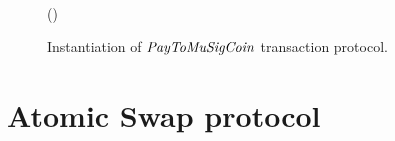 \begin{figure}
\begin{center}
{\begin{varwidth}{\textwidth}
{            \varSigAlice \opFunResult {} \< \< \\
            \varSigFin \opFunResult \procFinSig{\varSigAlice}{\varSigBob} \< \< \\
            \varExcess \opAssign {} \opAddPoint {} \< \< \\
            \scriptstyle \pcreturn \varTx \opAssign \varTx \opConc (\varExcess \opSeperate \varSigFin \opSeperate \varProof)
            }
        \end{varwidth}
        }
    \end{center}
    \caption{Instantiation of $\mathit{PayToMuSigCoin}$ transaction protocol. \label{fig:payToSharedCoin}}
\end{figure}

\section{Atomic Swap protocol}\label{sec:atomic-swap}